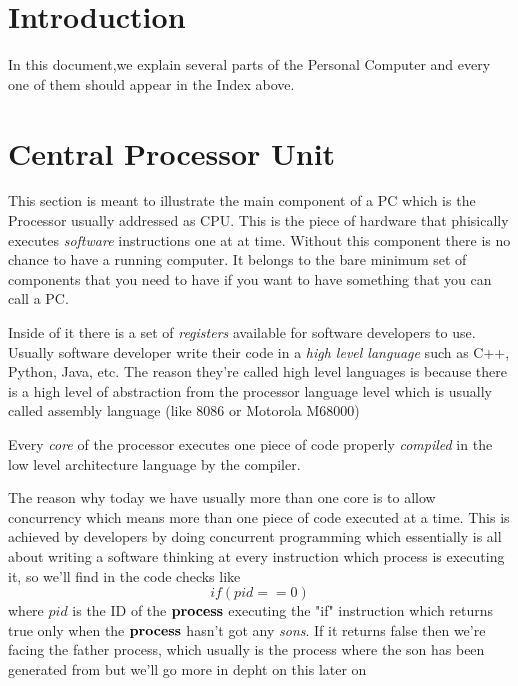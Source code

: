 \documentclass[a4paper,12pt]{article}
\begin{document}
\tableofcontents

\section{Introduction}
In this document,we explain several parts  of the Personal Computer
and every one of them should appear in the Index above.

\clearpage

\section{Central Processor Unit}
This section is meant to illustrate the main component of a PC 
which is the Processor usually addressed as CPU.
This is the piece of hardware that phisically executes \emph{software} instructions one at at time.
Without this component there is no chance to have a running computer. It belongs to the bare minimum set of 
components that you need to have if you want to have something that you can call a PC.

Inside of it there is a set of \emph{registers} available for software developers to use.
Usually software developer write their code in a \emph{high level language} such as C++, Python, Java, etc.
The reason they're called high level languages is because there is a high level of abstraction from the processor
language level which is usually called assembly language (like 8086 or Motorola M68000)

Every \emph{core} of the processor executes one piece of code properly \emph {compiled} in the low level architecture
language by the compiler.

The reason why today we have usually more than one core is to allow concurrency which means more than one piece of
code executed at a time. This is achieved by developers by doing concurrent programming which essentially is all about
writing a software thinking at every instruction which process is executing it, so we'll find in the code checks like
\[if (pid==0)\]
where $pid$ is the ID of the $\bf process$ executing the "if" instruction which returns true only when the $\bf process$ hasn't  got any \emph{sons}. If it returns false then we're facing the father process, which usually is the process where the son has been generated from but
we'll go more in depht on this later on

\end{document}
